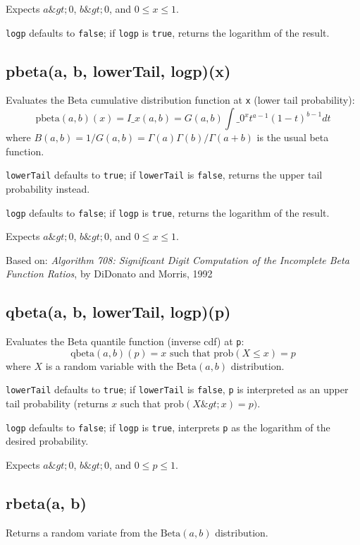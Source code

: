 \documentclass{article}
\begin{document}
Expects $a \&gt; 0$, $b \&gt; 0$, and $0 \leq x \leq 1$.


\texttt{logp} defaults to \texttt{false}; if \texttt{logp} is \texttt{true}, returns the
logarithm of the result.


    \subsection*{pbeta(a, b, lowerTail, logp)(x)}
    Evaluates the Beta cumulative distribution
function at \texttt{x} (lower tail probability):
$$\textrm{pbeta}(a, b)(x) = I\_x(a, b)=G(a,b)\int\_0^xt^{a-1}(1-t)^{b-1}dt$$
where $B(a,b)=1/G(a,b) = \Gamma(a)\Gamma(b)/\Gamma(a+b)$ is the
usual beta function.


\texttt{lowerTail} defaults to \texttt{true}; if \texttt{lowerTail} is \texttt{false}, returns
the upper tail probability instead.


\texttt{logp} defaults to \texttt{false}; if \texttt{logp} is \texttt{true}, returns the logarithm
of the result.


Expects $a\&gt;0$, $b\&gt;0$, and $0 \leq x \leq 1$.


Based on: \emph{Algorithm 708: Significant Digit Computation of the Incomplete Beta Function
Ratios}, by DiDonato and Morris, 1992


    \subsection*{qbeta(a, b, lowerTail, logp)(p)}
    Evaluates the Beta quantile function (inverse cdf) at \texttt{p}:
$$\textrm{qbeta}(a, b)(p) = x \textrm{ such that } \textrm{prob}(X \leq x) = p$$
where $X$ is a random variable with the $\textrm{Beta}(a,b)$ distribution.


\texttt{lowerTail} defaults to \texttt{true}; if \texttt{lowerTail} is \texttt{false}, \texttt{p} is
interpreted as an upper tail probability (returns
$x$ such that $\textrm{prob}(X \&gt; x) = p)$.


\texttt{logp} defaults to \texttt{false}; if \texttt{logp} is \texttt{true}, interprets \texttt{p} as
the logarithm of the desired probability.


Expects $a\&gt;0$, $b\&gt;0$, and $0 \leq p \leq 1$.


    \subsection*{rbeta(a, b)}
    Returns a random variate from the $\textrm{Beta}(a, b)$ distribution.
\end{document}
